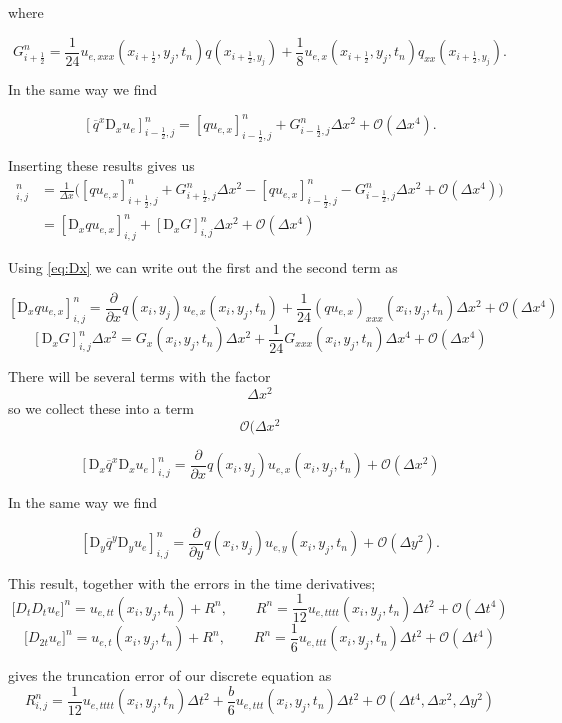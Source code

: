 \documentclass[a4paper, 11pt, notitlepage, english]{article}
\newcommand{\p}{\partial}
\newcommand{\D}{\mbox{D}}
\begin{document}
where

$$G^n_{i+\frac{1}{2}} = \frac{1}{24}{u_{e, xxx}}(x_{i+\frac{1}{2}},y_j,t_n)q(x_{i+\frac{1}{2},y_j}) + \frac{1}{8}{u_{e, x}}(x_{i+\frac{1}{2}},y_j,t_n)
q_{xx}(x_{i+\frac{1}{2},y_j}).$$

In the same way we find

$$[\overline{q}^x\D_xu_e]^n_{i-\frac{1}{2},j} = [qu_{e,x}]^n_{i-\frac{1}{2},j} + G^n_{i-\frac{1}{2},j}\Delta x^2 + \mathcal{O}(\Delta x^4).$$

Inserting these results gives us
\begin{align*}
 [\D_x\overline{q}^x\D_xu_e]^n_{i,j} &= \frac{1}{\Delta x}\bigg([qu_{e,x}]^n_{i+\frac{1}{2},j} + 
 G^n_{i+\frac{1}{2},j}\Delta x^2-[qu_{e,x}]^n_{i-\frac{1}{2},j} - G^n_{i-\frac{1}{2},j}\Delta x^2 + \mathcal{O}(\Delta x^4)\bigg)\\
 &= [\D_xqu_{e,x}]^n_{i,j} + [\D_xG]^n_{i,j}\Delta x^2 + \mathcal{O}(\Delta x^4)
\end{align*}

Using \ref{eq:Dx} we can write out the first and the second term as

$$ [\D_xqu_{e,x}]^n_{i,j} = \frac{\p}{\p x}q(x_i,y_j)u_{e,x}(x_i,y_j,t_n) + \frac{1}{24}(qu_{e,x})_{xxx}(x_i,y_j,t_n)\Delta x^2 + \mathcal{O}(\Delta x^4)$$
$$ [\D_xG]^n_{i,j}\Delta x^2 = G_x(x_i,y_j,t_n)\Delta x^2 + \frac{1}{24} G_{xxx}(x_i,y_j,t_n)\Delta x^4 + \mathcal{O}(\Delta x^4) $$


There will be several terms with the factor $$\Delta x^2$$ so we collect these into a term $$\mathcal{O}(\Delta x^2$$

$$[\D_x\overline{q}^x\D_xu_e]^n_{i,j} = \frac{\p}{\p x}q(x_i,y_j)u_{e,x}(x_i,y_j,t_n) + \mathcal{O}(\Delta x^2)$$

In the same way we find

$$[\D_y\overline{q}^y\D_yu_e]^n_{i,j} = \frac{\p}{\p y}q(x_i,y_j)u_{e,y}(x_i,y_j,t_n) + \mathcal{O}(\Delta y^2).$$

This result, together with the errors in the time derivatives;
$$\lbrack D_tD_t u_e \rbrack^n = u_{e,tt}(x_i,y_j,t_n) + R^n, \qquad R^n = \frac{1}{12}u_{e,tttt}(x_i,y_j,t_n)\Delta t^2 + {\mathcal{O}(\Delta t^4)}$$
$$\lbrack D_{2t}u_e \rbrack^n = u_{e,t}(x_i,y_j,t_n) + R^n, \qquad R^n = \frac{1}{6}u_{e,ttt}(x_i,y_j,t_n)\Delta t^2 + {\mathcal{O}(\Delta t^4)}$$

gives the truncation error of our discrete equation as
$$R^n_{i,j} =  \frac{1}{12}u_{e,tttt}(x_i,y_j,t_n)\Delta t^2 + \frac{b}{6}u_{e,ttt}(x_i,y_j,t_n)\Delta t^2 + \mathcal{O}(\Delta t^4,\Delta x^2, \Delta y^2)$$
\end{document}
